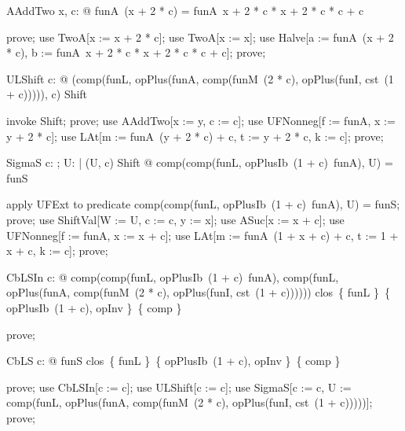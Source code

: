 \documentclass{article}
\begin{document}
\begin{theorem}{AAddTwo}
  \forall x, c: \nat @ funA~(x + 2 * c) = funA~x + 2 * c * x + 2 * c * c + c
\end{theorem}

\begin{zproof}
prove;
use TwoA[x := x + 2 * c];
use TwoA[x := x];
use Halve[a := funA~(x + 2 * c), b := funA~x + 2 * c * x + 2 * c * c + c];
prove;
\end{zproof}

\begin{theorem}{ULShift}
  \forall c: \nat @ (comp(funL, opPlus(funA, comp(funM~(2 * c), opPlus(funI, cst~(1 + c))))), c) \in Shift
\end{theorem}

\begin{zproof}
invoke Shift;
prove;
use AAddTwo[x := y, c := c];
use UFNonneg[f := funA, x := y + 2 * c];
use LAt[m := funA~(y + 2 * c) + c, t := y + 2 * c, k := c];
prove;
\end{zproof}

\begin{theorem}{SigmaS}
  \forall c: \nat; U: \nat \fun \nat | (U, c) \in Shift @ comp(comp(funL, opPlusIb~(1 + c)~funA), U) = funS
\end{theorem}

\begin{zproof}
apply UFExt to predicate comp(comp(funL, opPlusIb~(1 + c)~funA), U) = funS;
prove;
use ShiftVal[W := U, c := c, y := x];
use ASuc[x := x + c];
use UFNonneg[f := funA, x := x + c];
use LAt[m := funA~(1 + x + c) + c, t := 1 + x + c, k := c];
prove;
\end{zproof}

\begin{theorem}{CbLSIn}
  \forall c: \nat @ comp(comp(funL, opPlusIb~(1 + c)~funA), comp(funL, opPlus(funA, comp(funM~(2 * c), opPlus(funI, cst~(1 + c)))))) \in clos~\{ funL \}~\{ opPlusIb~(1 + c), opInv \}~\{ comp \}
\end{theorem}

\begin{zproof}
prove;
\end{zproof}

\begin{theorem}{CbLS}
  \forall c: \nat @ funS \in clos~\{ funL \}~\{ opPlusIb~(1 + c), opInv \}~\{ comp \}
\end{theorem}

\begin{zproof}
prove;
use CbLSIn[c := c];
use ULShift[c := c];
use SigmaS[c := c, U := comp(funL, opPlus(funA, comp(funM~(2 * c), opPlus(funI, cst~(1 + c)))))];
prove;
\end{zproof}
\end{document}
